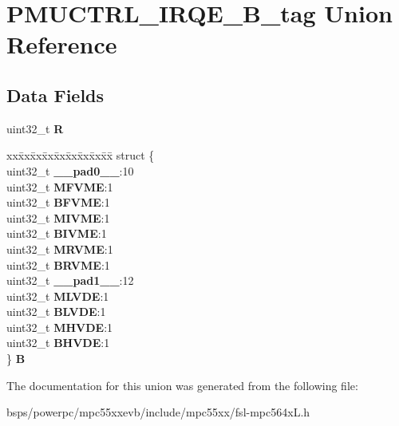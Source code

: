 \hypertarget{unionPMUCTRL__IRQE__32B__tag}{}\section{P\+M\+U\+C\+T\+R\+L\+\_\+\+I\+R\+Q\+E\+\_\+B\+\_\+tag Union Reference}
\label{unionPMUCTRL__IRQE__32B__tag}
\subsection*{Data Fields}
\begin{DoxyCompactItemize}
\item 
\mbox{\label{unionPMUCTRL__IRQE__32B__tag_a8e37c701e3e9b7c3e3ce1b9083ada026}} 
uint32\+\_\+t {\bfseries R}
\item 
\mbox{\label{unionPMUCTRL__IRQE__32B__tag_a6fdf0c168093bcdcd9530d8a97ad6092}} 
\begin{tabbing}
xx\=xx\=xx\=xx\=xx\=xx\=xx\=xx\=xx\=\kill
struct \{\\
\>uint32\_t {\bfseries \_\_pad0\_\_}:10\\
\>uint32\_t {\bfseries MFVME}:1\\
\>uint32\_t {\bfseries BFVME}:1\\
\>uint32\_t {\bfseries MIVME}:1\\
\>uint32\_t {\bfseries BIVME}:1\\
\>uint32\_t {\bfseries MRVME}:1\\
\>uint32\_t {\bfseries BRVME}:1\\
\>uint32\_t {\bfseries \_\_pad1\_\_}:12\\
\>uint32\_t {\bfseries MLVDE}:1\\
\>uint32\_t {\bfseries BLVDE}:1\\
\>uint32\_t {\bfseries MHVDE}:1\\
\>uint32\_t {\bfseries BHVDE}:1\\
\} {\bfseries B}\\

\end{tabbing}\end{DoxyCompactItemize}


The documentation for this union was generated from the following file\+:\begin{DoxyCompactItemize}
\item 
bsps/powerpc/mpc55xxevb/include/mpc55xx/fsl-\/mpc564x\+L.\+h\end{DoxyCompactItemize}
